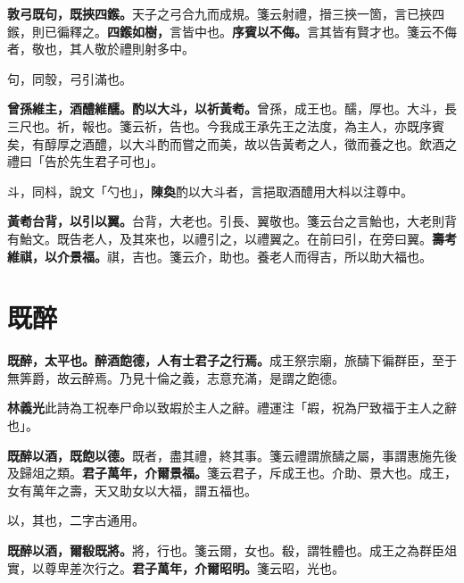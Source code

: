 \textbf{敦弓既句，既挾四鍭。}{\footnotesize 天子之弓合九而成規。箋云射禮，搢三挾一箇，言已挾四鍭，則已徧釋之。}\textbf{四鍭如樹，}{\footnotesize 言皆中也。}\textbf{序賓以不侮。}{\footnotesize 言其皆有賢才也。箋云不侮者，敬也，其人敬於禮則射多中。}

\begin{quoting}句，同彀，弓引滿也。\end{quoting}

\textbf{曾孫維主，酒醴維醹。酌以大斗，以祈黃耇。}{\footnotesize 曾孫，成王也。醹，厚也。大斗，長三尺也。祈，報也。箋云祈，告也。今我成王承先王之法度，為主人，亦既序賓矣，有醇厚之酒醴，以大斗酌而嘗之而美，故以告黃耇之人，徵而養之也。飲酒之禮曰「告於先生君子可也」。}

\begin{quoting}斗，同枓，說文「勺也」，\textbf{陳奐}酌以大斗者，言挹取酒醴用大枓以注尊中。\end{quoting}

\textbf{黃耇台背，以引以翼。}{\footnotesize 台背，大老也。引長、翼敬也。箋云台之言鮐也，大老則背有鮐文。既告老人，及其來也，以禮引之，以禮翼之。在前曰引，在旁曰翼。}\textbf{壽考維祺，以介景福。}{\footnotesize 祺，吉也。箋云介，助也。養老人而得吉，所以助大福也。}

\section{既醉}


\textbf{既醉，太平也。醉酒飽德，人有士君子之行焉。}{\footnotesize 成王祭宗廟，旅醻下徧群臣，至于無筭爵，故云醉焉。乃見十倫之義，志意充滿，是謂之飽德。}

\begin{quoting}\textbf{林義光}此詩為工祝奉尸命以致嘏於主人之辭。禮運注「嘏，祝為尸致福于主人之辭也」。\end{quoting}

\textbf{既醉以酒，既飽以德。}{\footnotesize 既者，盡其禮，終其事。箋云禮謂旅醻之屬，事謂惠施先後及歸俎之類。}\textbf{君子萬年，介爾景福。}{\footnotesize 箋云君子，斥成王也。介助、景大也。成王，女有萬年之壽，天又助女以大福，謂五福也。}

\begin{quoting}以，其也，二字古通用。\end{quoting}

\textbf{既醉以酒，爾殽既將。}{\footnotesize 將，行也。箋云爾，女也。殽，謂牲體也。成王之為群臣俎實，以尊卑差次行之。}\textbf{君子萬年，介爾昭明。}{\footnotesize 箋云昭，光也。}

